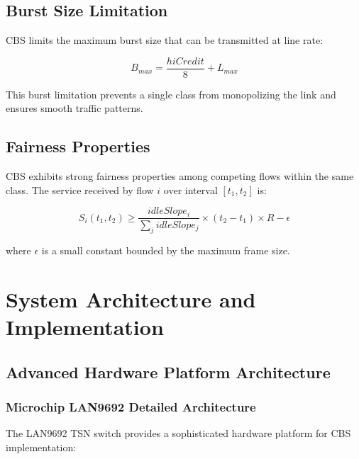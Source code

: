 \documentclass[10pt, journal, compsoc]{IEEEtran}
\begin{document}
\subsection{Burst Size Limitation}

CBS limits the maximum burst size that can be transmitted at line rate:

\begin{equation}
B_{max} = \frac{hiCredit}{8} + L_{max}
\end{equation}

This burst limitation prevents a single class from monopolizing the link and ensures smooth traffic patterns.

\subsection{Fairness Properties}

CBS exhibits strong fairness properties among competing flows within the same class. The service received by flow $i$ over interval $[t_1, t_2]$ is:

\begin{equation}
S_i(t_1, t_2) \geq \frac{idleSlope_i}{\sum_j idleSlope_j} \times (t_2 - t_1) \times R - \epsilon
\end{equation}

where $\epsilon$ is a small constant bounded by the maximum frame size.

\section{System Architecture and Implementation}
\label{sec:system_architecture}

\subsection{Advanced Hardware Platform Architecture}

\subsubsection{Microchip LAN9692 Detailed Architecture}

The LAN9692 TSN switch provides a sophisticated hardware platform for CBS implementation:
\end{document}
